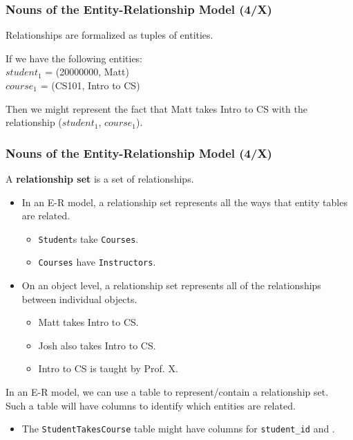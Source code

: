 \begin{frame}
\frametitle{Nouns of the Entity-Relationship Model (4/X)}
Relationships are formalized as tuples of entities.

If we have the following entities:\\
$student_1$ = (20000000, Matt)\\
$course_1$ = (CS101, Intro to CS)

Then we might represent the fact that Matt takes Intro to CS with the relationship ($student_1$, $course_1$).

\end{frame}


\begin{frame}
\frametitle{Nouns of the Entity-Relationship Model (4/X)}

A \textbf{relationship set} is a set of relationships.\\
\begin{itemize}
  \item In an E-R model, a relationship set represents all the ways that entity tables are related.
  \begin{itemize}
    \item \texttt{Student}s take \texttt{Courses}.
    \item \texttt{Courses} have \texttt{Instructors}.
  \end{itemize}

  \item On an object level, a relationship set represents all of the relationships between individual objects.

  \begin{itemize}
    \item Matt takes Intro to CS.
    \item Josh also takes Intro to CS.
    \item Intro to CS is taught by Prof. X.
  \end{itemize}
\end{itemize}

In an E-R model, we can use a table to represent/contain a relationship set.\\
Such a table will have columns to identify which entities are related.\\
\begin{itemize}
  \item The \texttt{StudentTakesCourse} table might have columns for \texttt{student\_id} and .
\end{itemize}

\end{frame}



